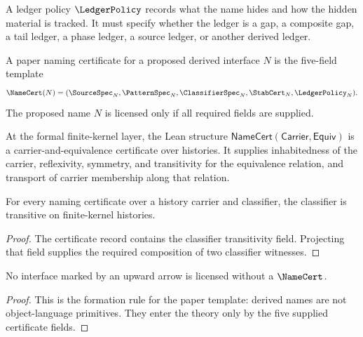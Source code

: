 \begin{definition}
A ledger policy \(\LedgerPolicy\) records what the name hides and how the hidden material is tracked. It must specify whether the ledger is a gap, a composite gap, a tail ledger, a phase ledger, a source ledger, or another derived ledger.
\end{definition}

\begin{definition}
\label{def:typed-naming-certificate}
\label{def:naming-certificate}
A paper naming certificate for a proposed derived interface \(N\) is the five-field template
$$
\NameCert(N)=
(\SourceSpec_N,\PatternSpec_N,\ClassifierSpec_N,\StabCert_N,\LedgerPolicy_N).
$$
The proposed name \(N\) is licensed only if all required fields are supplied.
\end{definition}

\begin{definition}
\label{def:lean-carrier-naming-certificate}
At the formal finite-kernel layer, the Lean structure
\(\mathsf{NameCert}(\mathsf{Carrier},\mathsf{Equiv})\) is a carrier-and-equivalence certificate over histories. It supplies inhabitedness of the carrier, reflexivity, symmetry, and transitivity for the equivalence relation, and transport of carrier membership along that relation.
\end{definition}

\begin{theorem}
\label{thm:namecert-equivalence-transitivity}
For every naming certificate over a history carrier and classifier, the classifier is transitive on finite-kernel histories.
\end{theorem}
\begin{proof}
The certificate record contains the classifier transitivity field. Projecting that field supplies the required composition of two classifier witnesses.
\end{proof}

\begin{theorem}
\label{thm:derived-interfaces-require-certificates}
No interface marked by an upward arrow is licensed without a \(\NameCert\).
\end{theorem}
\begin{proof}
This is the formation rule for the paper template: derived names are not object-language primitives. They enter the theory only by the five supplied certificate fields.
\end{proof}

